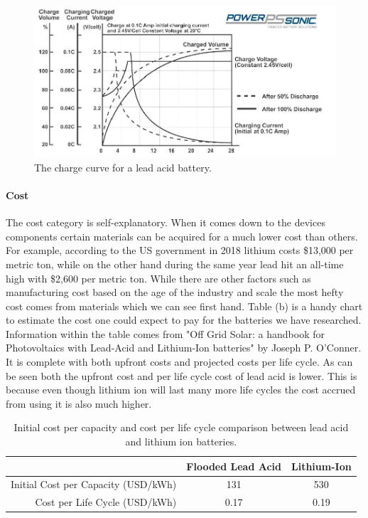 \begin{figure}
    \centering
    \includegraphics[scale=0.5]{figures/lead acid charge curve.png}
    \caption{The charge curve for a lead acid battery.}
    \label{fig:lead-acid-charge-curve} 
\end{figure}
\paragraph{Cost}
The cost category is self-explanatory. When it comes down to the devices components certain materials can be acquired for a much lower cost than others. For example, according to the US government in 2018 lithium costs \$13,000 per metric ton, while on the other hand during the same year lead hit an all-time high with \$2,600 per metric ton. While there are other factors such as manufacturing cost based on the age of the industry and scale the most hefty cost comes from materials which we can see first hand. Table (b) is a handy chart to estimate the cost one could expect to pay for the batteries we have researched. Information within the table comes from "Off Grid Solar: a handbook for Photovoltaics with Lead-Acid and Lithium-Ion batteries" by Joseph P. O'Conner. It is complete with both upfront costs and projected costs per life cycle. As can be seen both the upfront cost and per life cycle cost of lead acid is lower. This is because even though lithium ion will last many more life cycles the cost accrued from using it is also much higher.

\begin{table}
\centering\scriptsize
\caption{Initial cost per capacity and cost per life cycle comparison between lead acid and lithium ion batteries.}
\begin{tabular}{|r|c|c|}
\hline
& Flooded Lead Acid & Lithium-Ion \\ 
\hline
Initial Cost per Capacity (USD/kWh)    & 131   & 530  \\\hline
Cost per Life Cycle (USD/kWh)    & 0.17     & 0.19 \\\hline
\end{tabular}
\label{tab:battery-cost-comparison}
\end{table}

